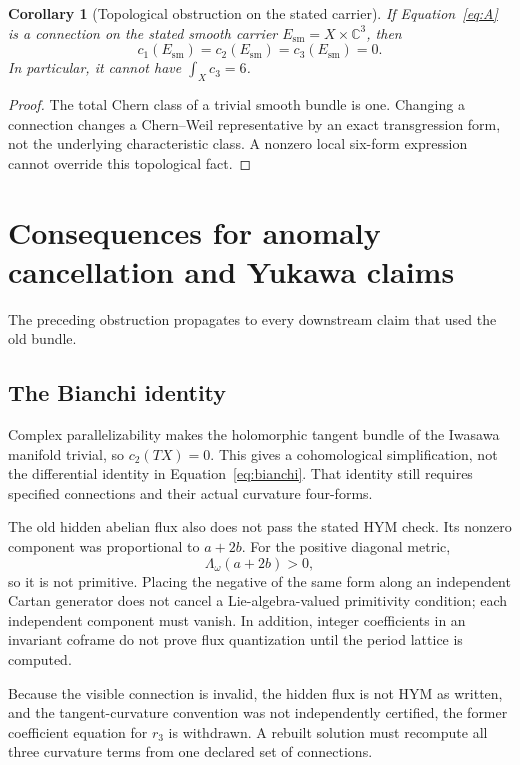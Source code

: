 \documentclass[11pt]{article}
\newcommand{\C}{\mathbb{C}}
\newtheorem{corollary}[theorem]{Corollary}
\theoremstyle{definition}
\theoremstyle{remark}
\begin{document}
\begin{corollary}[Topological obstruction on the stated carrier]
\label{cor:trivial}
If Equation~\eqref{eq:A} is a connection on the stated smooth carrier
\(E_{\mathrm{sm}}=X\times\C^3\), then
\[
c_1(E_{\mathrm{sm}})=c_2(E_{\mathrm{sm}})
=c_3(E_{\mathrm{sm}})=0.
\]
In particular, it cannot have \(\int_Xc_3=6\).
\end{corollary}

\begin{proof}
The total Chern class of a trivial smooth bundle is one.  Changing a connection
changes a Chern--Weil representative by an exact transgression form, not the
underlying characteristic class.  A nonzero local six-form expression cannot
override this topological fact.
\end{proof}

\section{Consequences for anomaly cancellation and Yukawa claims}
\label{sec:downstream}

The preceding obstruction propagates to every downstream claim that used the
old bundle.

\subsection{The Bianchi identity}

Complex parallelizability makes the holomorphic tangent bundle of the Iwasawa
manifold trivial, so \(c_2(TX)=0\).  This gives a cohomological simplification,
not the differential identity in Equation~\eqref{eq:bianchi}.  That identity
still requires specified connections and their actual curvature four-forms.

The old hidden abelian flux also does not pass the stated HYM check.  Its
nonzero component was proportional to \(a+2b\).  For the positive diagonal
metric,
\[
\Lambda_\omega(a+2b)>0,
\]
so it is not primitive.  Placing the negative of the same form along an
independent Cartan generator does not cancel a Lie-algebra-valued primitivity
condition; each independent component must vanish.  In addition, integer
coefficients in an invariant coframe do not prove flux quantization until the
period lattice is computed.

Because the visible connection is invalid, the hidden flux is not HYM as
written, and the tangent-curvature convention was not independently certified,
the former coefficient equation for \(r_3\) is withdrawn.  A rebuilt solution
must recompute all three curvature terms from one declared set of connections.
\end{document}
